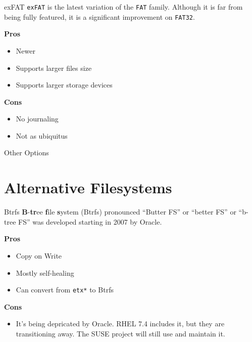 \documentclass{lug}
\begin{document}
\begin{frame}{exFAT}
    \texttt{exFAT} is the latest variation of the \texttt{FAT} family. Although
    it is far from being fully featured, it is a significant improvement on
    \texttt{FAT32}.

    \textbf{Pros}
    \begin{itemize}
        \item Newer
        \item Supports larger files size
        \item Supports larger storage devices
    \end{itemize}

    \textbf{Cons}
    \begin{itemize}
        \item No journaling
        \item Not as ubiquitus
    \end{itemize}
\end{frame}


\begin{frame}{Other Options}
\end{frame}

\section{Alternative Filesystems}
\begin{frame}{Btrfs}
    \textbf{B}-\textbf{tr}ee \textbf{f}ile \textbf{s}ystem (Btrfs) pronounced
    ``Butter FS'' or ``better FS'' or ``b-tree FS'' was developed starting in
    2007 by Oracle.

    \textbf{Pros}
    \begin{itemize}
        \item Copy on Write
        \item Mostly self-healing
        \item Can convert from \texttt{etx*} to Btrfs
    \end{itemize}

    \textbf{Cons}
    \begin{itemize}
        \item It's being depricated by Oracle. RHEL 7.4 includes it, but they
            are transitioning away. The SUSE project will still use and maintain
            it.
    \end{itemize}
\end{frame}

\end{document}
